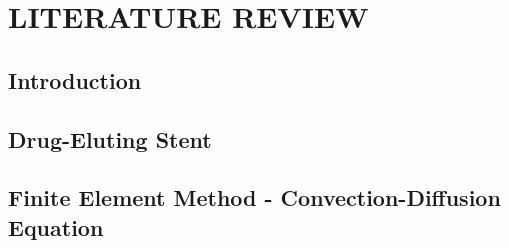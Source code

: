 \chapter{\textbf{LITERATURE REVIEW}}
\label{chap:chapname}

\section{\textbf{Introduction}} 


\section{\textbf{Drug-Eluting Stent}} 
\label{sec:secname}



\section{\textbf{Finite Element Method - Convection-Diffusion Equation}} 
\label{sec:secname}




